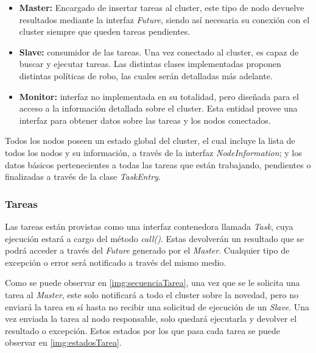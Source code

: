 \documentclass[12pt,a4paper,oneside,spanish]{report}
\begin{document}
\begin{itemize}
	\item \textbf{Master:} Encargado de insertar tareas al cluster, este tipo de nodo devuelve resultados mediante la interfaz \textit{Future}, siendo así necesaria su conexión con el cluster siempre que queden tareas pendientes.
	\item \textbf{Slave:} consumidor de las tareas. Una vez conectado al cluster, es capaz de buscar y ejecutar tareas. Las distintas clases implementadas proponen distintas políticas de robo, las cuales serán detalladas más adelante.
	\item \textbf{Monitor:} interfaz no implementada en su totalidad, pero diseñada para el acceso a la información detallada sobre el cluster. Esta entidad provee una interfaz para obtener datos sobre las tareas y los nodos conectados.
\end{itemize}


Todos los nodos poseen un estado global del cluster, el cual incluye la lista de todos los nodos y su información, a través de la interfaz \textit{NodeInformation}; y los datos básicos pertenecientes a todas las tareas que están trabajando, pendientes o finalizadas a través de la clase \textit{TaskEntry}.

\label{fig:interfacesNodos}
\label{fig:clasesNodos}

\subsubsection*{Tareas}

Las tareas están provistas como una interfaz contenedora llamada \textit{Task}, cuya ejecución estará a cargo del método \textit{call()}. Estas devolverán un resultado que se podrá acceder a través del \textit{Future} generado por el \textit{Master}. Cualquier tipo de excepción o error será notificado a través del mismo medio.


Como se puede observar en \ref{img:secuenciaTarea}, una vez que se le solicita una tarea al \textit{Master}, este solo notificará a todo el cluster sobre la novedad, pero no enviará la tarea en sí hasta no recibir una solicitud de ejecución de un \textit{Slave}. Una vez enviada la tarea al nodo responsable, solo quedará ejecutarla y devolver el resultado o excepción. Estos estados por los que pasa cada tarea se puede observar en \ref{img:estadosTarea}.
\end{document}
